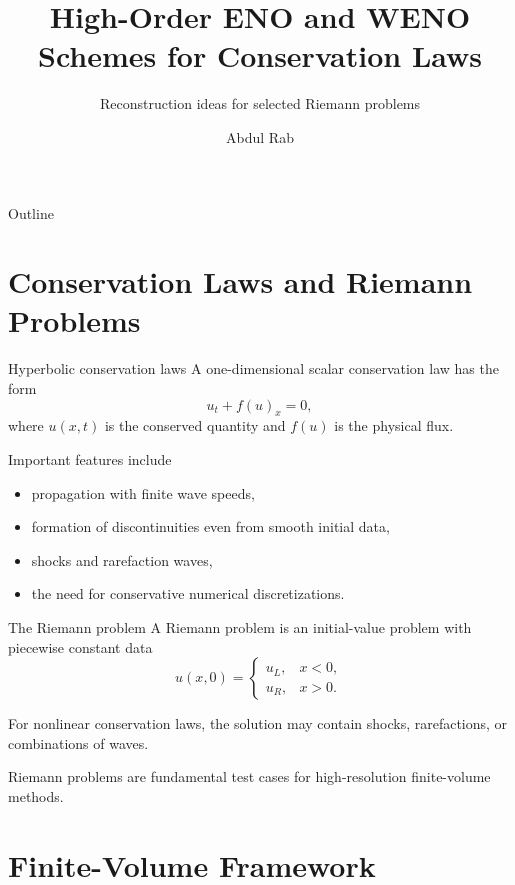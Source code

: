 \documentclass[aspectratio=169]{beamer}
\title{High-Order ENO and WENO Schemes for Conservation Laws}
\subtitle{Reconstruction ideas for selected Riemann problems}
\author{Abdul Rab}
\institute{Sukkur IBA University}
\date{}
\begin{document}
\begin{frame}
    \titlepage
\end{frame}

\begin{frame}{Outline}
\tableofcontents
\end{frame}

\section{Conservation Laws and Riemann Problems}

\begin{frame}{Hyperbolic conservation laws}
A one-dimensional scalar conservation law has the form
\begin{equation}
    u_t + f(u)_x = 0,
\end{equation}
where $u(x,t)$ is the conserved quantity and $f(u)$ is the physical flux.

\medskip
Important features include
\begin{itemize}
    \item propagation with finite wave speeds,
    \item formation of discontinuities even from smooth initial data,
    \item shocks and rarefaction waves,
    \item the need for conservative numerical discretizations.
\end{itemize}
\end{frame}

\begin{frame}{The Riemann problem}
A Riemann problem is an initial-value problem with piecewise constant data
\begin{equation}
    u(x,0)=
    \begin{cases}
        u_L, & x<0,\\
        u_R, & x>0.
    \end{cases}
\end{equation}

For nonlinear conservation laws, the solution may contain shocks, rarefactions, or combinations of waves.

\medskip
Riemann problems are fundamental test cases for high-resolution finite-volume methods.
\end{frame}

\section{Finite-Volume Framework}
\end{document}
